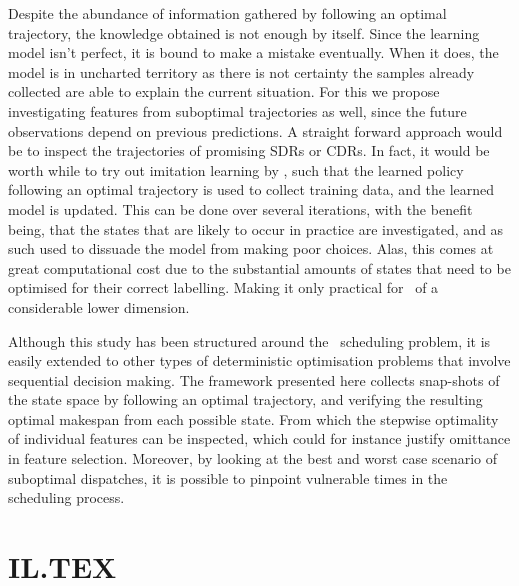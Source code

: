 Despite the abundance of information gathered by following an optimal 
trajectory, the knowledge obtained is not enough by itself. Since the learning 
model isn't perfect, it is bound to make a mistake eventually. When it does, 
the model is in uncharted  territory as there is not certainty the samples 
already collected are able to explain the current situation. For this we 
propose investigating features from suboptimal trajectories as well, since the 
future observations depend on previous predictions. 
A straight forward approach would be to inspect 
the trajectories of promising SDRs or CDRs. 
In fact, it would be worth while to try out imitation learning by 
\cite{RossB10,RossGB11}, such that the learned policy following an optimal 
trajectory is used to collect training data, and the learned model is updated. 
This can be done over several iterations, with the benefit being, that the 
states that are likely to occur in practice are investigated, and as such used 
to dissuade the model from making poor choices. Alas, this comes at great 
computational cost due to the substantial amounts of states that need to be 
optimised for their correct labelling. Making it only practical for \jsp\ of 
a considerable lower dimension. 

Although this study has been structured around the \jsp\ scheduling problem, 
it is easily extended to other types of deterministic optimisation problems 
that involve sequential decision making. 
The framework presented here collects snap-shots of the state space by 
following an optimal trajectory, and verifying the resulting optimal makespan 
from each possible state. 
From which the stepwise optimality of individual features can be inspected, 
which could for instance justify omittance in feature selection. 
Moreover, by looking at the best and worst case scenario of suboptimal 
dispatches, it is possible to pinpoint vulnerable times in the scheduling 
process. 

\section{IL.TEX}


